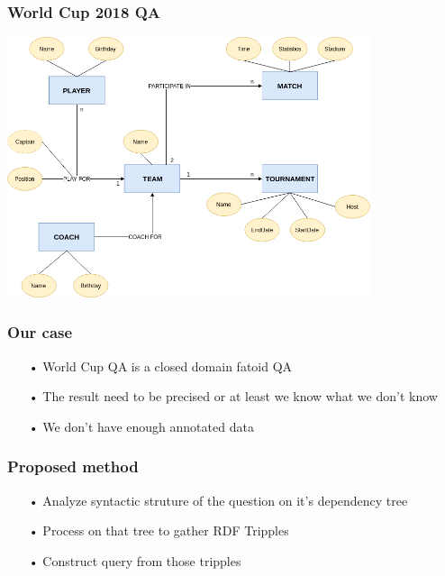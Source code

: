 \documentclass{beamer}
\begin{document}
\begin{frame}
	\frametitle{World Cup 2018 QA}		

	\begin{center} 
		\centering 
			\includegraphics[width=0.8\textwidth,height=0.8\textheight,keepaspectratio]{ourkb} 			
			\vspace{0.5cm}
	\end{center}		
			
\end{frame}

\begin{frame}
	\frametitle{Our case}		

			
	\begin{itemize}
		\item[•] World Cup QA is a closed domain fatoid QA
		
		\item[•] The result need to be precised or at least we know what we don't know
		
		\item[•] We don't have enough annotated data  
			
	\end{itemize}		

\end{frame}

\begin{frame}
	\frametitle{Proposed method}		

			
	\begin{itemize}
		\item[•] Analyze syntactic struture of the question on it's dependency tree
		
		\item[•] Process on that tree to gather RDF Tripples
		
		\item[•] Construct query from those tripples
			
	\end{itemize}		

\end{frame}
\end{document}
